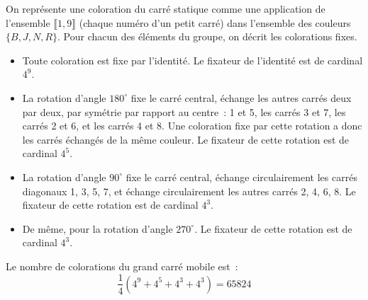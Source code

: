 \documentclass[a4paper,11pt]{exam}
\begin{document}
\begin{questions}
\begin{enumerate}[resume]
	\begin{solution}
		On représente une coloration du carré statique comme une application de
		l'ensemble $\llbracket 1,9 \rrbracket$ (chaque numéro d'un petit carré)
		dans l'ensemble des couleurs $\{B, J, N, R\}$.
		Pour chacun des éléments du groupe, on décrit les colorations fixes.
		\begin{itemize}
			\item Toute coloration est fixe par l'identité.
			Le fixateur de l'identité est de cardinal $4^9$.
			\item La rotation d'angle $180^\circ$ fixe le carré central, échange
			les autres carrés deux par deux, par symétrie par rapport au
			centre~: 1 et 5, les carrés 3 et 7, les carrés 2 et 6, et les carrés
			4 et 8.
			Une coloration fixe par cette rotation a donc les carrés échangés de
			la même couleur.
			Le fixateur de cette rotation est de cardinal $4^5$.
			\item La rotation d'angle $90^\circ$ fixe le carré central, échange
			circulairement les carrés diagonaux 1, 3, 5, 7, et échange
			circulairement les autres carrés 2, 4, 6, 8.
			Le fixateur de cette rotation est de cardinal $4^3$.
			\item De même, pour la rotation d'angle $270^\circ$.
			Le fixateur de cette rotation est de cardinal $4^3$.
		\end{itemize}
		Le nombre de colorations du grand carré mobile est~:
		\[
		\frac{1}{4}(4^9+4^5+4^3+4^3) = 65824
		\]
	\end{solution}
\end{enumerate}



\end{questions}
\end{document}

